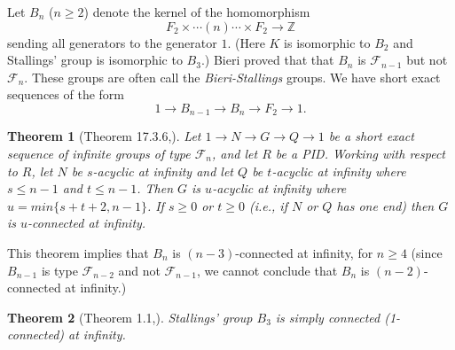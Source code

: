 \documentclass[12pt]{article}
\newtheorem{theorem}{Theorem}[subsection]
\begin{document}
Let $B_n$ ($n \geq 2$) denote the kernel of the homomorphism 
$$F_2 \times  \cdots (n) \cdots \times F_2 \rightarrow {\mathbb Z}$$
 sending all generators to the generator $1$. (Here $K$ is isomorphic to $B_2$ and Stallings' group is isomorphic to $B_3$.)  Bieri \cite{Bieri81} proved that that $B_n$ is $\mathcal F_{n-1}$ but not $\mathcal F_n$. These groups are often call the {\it Bieri-Stallings} groups. %
 We have short exact sequences of the form 
 $$1 \rightarrow B_{n-1} \rightarrow B_n \rightarrow F_2 \rightarrow 1.$$ 
\begin{theorem} [Theorem 17.3.6,\cite{G}] Let $1\to N\to G\to Q\to 1$  be a short exact sequence of infinite
groups of type $\mathcal F_n$, and let $R$ be a PID. Working with respect to $R$, let $N$ be
$s$-acyclic at infinity and let $Q$ be $t$-acyclic at infinity where $s\leq n-1$ and
$t \leq n-1$. Then $G$ is $u$-acyclic at infinity where $u=min\{s + t + 2, n-1\}$. If
$s\geq 0$ or $t\geq 0$  (i.e., if $N$ or $Q$ has one end) then $G$ is $u$-connected at infinity.
 \end{theorem}
 \medskip
 
 This theorem implies that $B_n$ is $(n-3)$-connected at infinity, for $n \geq 4$
 (since $B_{n-1}$ is type $\mathcal F_{n-2}$ and not $\mathcal F_{n-1}$, we cannot conclude that $B_n$ is $(n-2)$-connected at infinity.) 
  
 \begin{theorem} [Theorem 1.1,\cite{MM24}]\label{MM24}  
Stallings' group $B_3$ is simply connected (1-connected) at infinity.
\end{theorem} 
\end{document}
